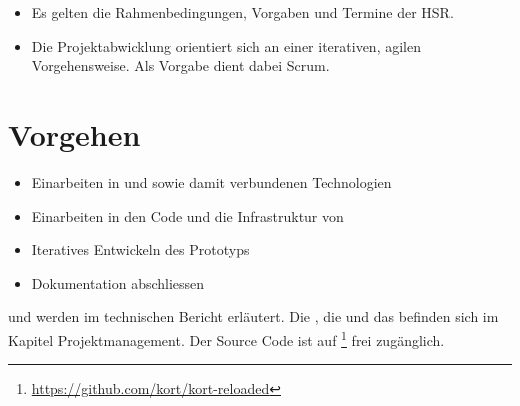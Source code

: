 \begin{itemize}
	\item Es gelten die Rahmenbedingungen, Vorgaben und Termine der HSR.
	\item Die Projektabwicklung orientiert sich an einer iterativen, agilen Vorgehensweise. 
	Als Vorgabe dient dabei Scrum.
\end{itemize}

\section{Vorgehen}
\begin{itemize}
	\item Einarbeiten in  und  sowie damit verbundenen Technologien
	\item Einarbeiten in den Code und die Infrastruktur von \kort{}
	\item Iteratives Entwickeln des Prototyps
	\item Dokumentation abschliessen
\end{itemize}

 und  werden im technischen Bericht erläutert.
Die , die  und das  befinden sich im Kapitel Projektmanagement. 
Der Source Code ist auf \footnote{\url{https://github.com/kort/kort-reloaded}} frei zugänglich. 

